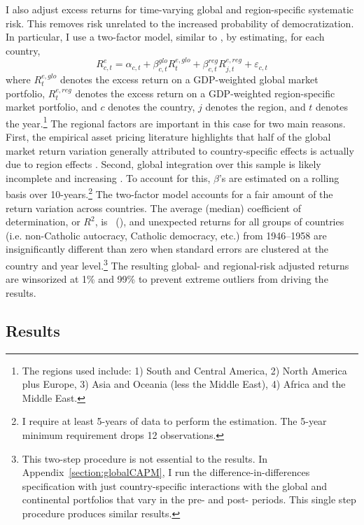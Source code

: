 I also adjust excess returns for time-varying global and region-specific systematic risk. This removes risk unrelated to the increased probability of democratization.  In particular, I use a two-factor model, similar to \cite*{Bekaert2009}, by estimating, for each country,
\begin{equation}
R^e_{c,t} = \alpha_{c,t} + \beta^{glo}_{c,t}R^{e,glo}_t + \beta^{reg}_{c,t}R^{e,reg}_{j,t} + \varepsilon_{c,t}\label{eq:twoFactor}
\end{equation}
where $R^{e,glo}_t$ denotes the excess return on a GDP-weighted global market portfolio, $R^{e,reg}_t$ denotes the excess return on a GDP-weighted region-specific market portfolio, and $c$ denotes the country, $j$ denotes the region, and $t$ denotes the year.\footnote{The regions used include: 1) South and Central America, 2) North America plus Europe, 3) Asia and Oceania (less the Middle East), 4) Africa and the Middle East.} The regional factors are important in this case for two main reasons. First, the empirical asset pricing literature highlights that half of the global market return variation generally attributed to country-specific effects is actually due to region effects \citep{Brooks2005}.  Second, global integration over this sample is likely incomplete and increasing \citep{Bekaert1995,Baele2005,Bekaert2009}. To account for this, $\beta$'s are estimated on a rolling basis over 10-years.\footnote{I require at least 5-years of data to perform the estimation. The 5-year minimum requirement drops 12 observations.} The two-factor model accounts for a fair amount of the return variation across countries. The average (median) coefficient of determination, or $R^2$, is \twoFactorRTwoMean\ (\twoFactorRTwoMedian), and unexpected returns for all groups of countries (i.e. non-Catholic autocracy, Catholic democracy, etc.) from 1946--1958 are insignificantly different than zero when standard errors are clustered at the country and year level.\footnote{This two-step procedure is not essential to the results. In Appendix~\ref{section:globalCAPM}, I run the difference-in-differences specification with just country-specific interactions with the global and continental portfolios that vary in the pre- and post- periods. This single step procedure produces similar results.} The resulting global- and regional-risk adjusted returns are winsorized at 1\% and 99\% to prevent extreme outliers from driving the results.

\subsection{Results}

